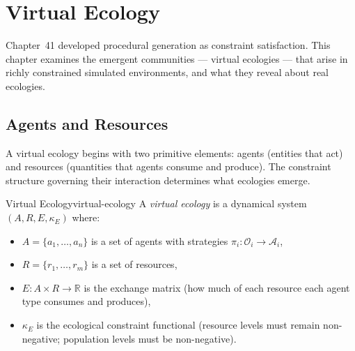 \chapter{Virtual Ecology}



Chapter~41 developed procedural generation as constraint satisfaction.
This chapter examines the emergent communities — virtual ecologies — that
arise in richly constrained simulated environments, and what they reveal
about real ecologies.

\section{Agents and Resources}

A virtual ecology begins with two primitive elements: agents (entities
that act) and resources (quantities that agents consume and produce).
The constraint structure governing their interaction determines what
ecologies emerge.

\begin{definition}{Virtual Ecology}{virtual-ecology}
  A \emph{virtual ecology} is a dynamical system $(A, R, E, \kappa_E)$
  where:
  \begin{itemize}
    \item $A = \{a_1, \ldots, a_n\}$ is a set of agents with strategies
          $\pi_i : \mathcal{O}_i \to \mathcal{A}_i$,
    \item $R = \{r_1, \ldots, r_m\}$ is a set of resources,
    \item $E : A \times R \to \mathbb{R}$ is the exchange matrix
          (how much of each resource each agent type consumes and
          produces),
    \item $\kappa_E$ is the ecological constraint functional
          (resource levels must remain non-negative; population
          levels must be non-negative).
  \end{itemize}
\end{definition}

